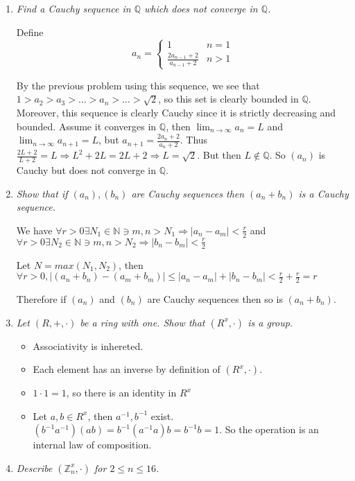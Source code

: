 \documentclass[11pt]{article}
\begin{document}
\begin{enumerate}
\item \emph{Find a Cauchy sequence in $\mathbb{Q}$ which does not converge in $\mathbb{Q}$.}

Define 
\[ a_n = \left\{
              \begin{array}{ll}
                   1 & n = 1\\
                   \frac{2a_{n-1} + 2}{a_{n-1}+2} & n > 1
              \end{array}
       \right.
\]

By the previous problem using this sequence, we see that $1>a_2>a_3>\ldots>a_n>\ldots>\sqrt{2}$, so this set is clearly bounded in $\mathbb{Q}$.  Moreover, this sequence is clearly Cauchy since it is strictly decreasing and bounded.  Assume it converges in $\mathbb{Q}$, then $\lim_{n\to\infty}a_n=L$ and $\lim_{n\to\infty}a_{n+1}=L$, but $a_{n+1} = \frac{2a_n+ 2}{a_n+2}$.  Thus $\frac{2L+2}{L+2} = L \Rightarrow L^2+2L=2L+2 \Rightarrow L=\sqrt{2}$.  But then $L \notin \mathbb{Q}$.  So $(a_n)$ is Cauchy but does not converge in $\mathbb{Q}$.

\item \emph{Show that if $(a_n),(b_n)$ are Cauchy sequences then $(a_n + b_n)$ is a Cauchy sequence.}

We have 
$\forall r>0 \exists N_1 \in \mathbb{N} \ni m,n>N_1 \Rightarrow |a_n - a_m|<\frac{r}{2}$ and 
$\forall r>0 \exists N_2 \in \mathbb{N} \ni m,n>N_2 \Rightarrow |b_n - b_m|<\frac{r}{2}$

Let $N=max(N_1,N_2)$, then  $\forall r>0,|(a_n + b_n) - (a_m + b_m)| \leq |a_n - a_m| + |b_n - b_m| < \frac{r}{2} + \frac{r}{2} = r$

Therefore if $(a_n)$ and $(b_n)$ are Cauchy sequences then so is $(a_n + b_n)$.

\item \emph{Let $(R,+,\cdot)$ be a ring with one. Show that $(R^x,\cdot)$ is a group.}
\begin{itemize}
\item Associativity is inhereted.
\item Each element has an inverse by definition of $(R^x,\cdot)$.
\item $1\cdot1 = 1$, so there is an identity in $R^x$
\item Let $a,b \in R^x$, then $a^{-1},b^{-1}$ exist.  $(b^{-1}a^{-1})(ab) = b^{-1}(a^{-1}a)b = b^{-1}b = 1$.  So the operation is an internal law of composition.
\end{itemize}

\item \emph{Describe $(\mathbb{Z}^x_n,\cdot)$ for $2 \leq n \leq 16$.}


\end{enumerate}
\end{document}
